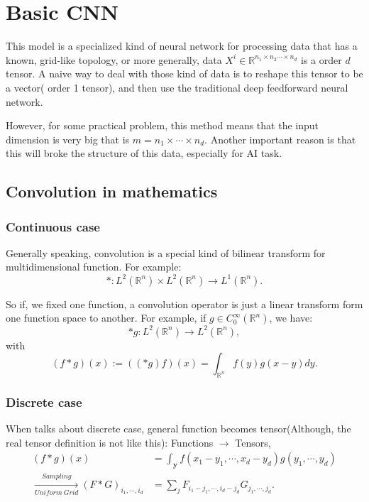 \chapter{Basic CNN}

This model is a specialized kind of neural network for processing data that has a known, grid-like topology, or more generally, data $X^i \in \mathbb{R}^{n_1\times n_2\cdots\times n_d}$ is a order $d$ tensor. A naive way to deal with those kind of data is to reshape this tensor to be a vector( order 1 tensor), and then use the traditional deep feedforward neural network.

However, for some practical problem, this method means that the input dimension is very big that is $m = n_1\times\cdots \times n_d$. Another important reason is that this will broke the structure of this data, especially for AI task.

\section{Convolution in mathematics}
\subsection{Continuous case}
Generally speaking, convolution is a special kind of bilinear transform for multidimensional function. For example:
\begin{equation}
\ast: L^2(\mathbb{R}^n) \times L^2(\mathbb{R}^n) \to L^1(\mathbb{R}^n).
\end{equation}

So if, we fixed one function, a convolution operator is just a linear transform form one function space to another. For example, if $g \in C_0^{\infty}(\mathbb{R}^n)$, we have:
\begin{equation}
\ast g: L^2(\mathbb{R}^n) \to L^2(\mathbb{R}^n),
\end{equation}
with 
\begin{equation}
(f\ast g)(x) := ((\ast g)f )(x) = \int_{\mathbb{R}^n} f(y)g(x-y) dy. 
\end{equation}

\subsection{Discrete case}
When talks about discrete case, general function becomes tensor(Although, the real tensor definition is not like this):
Functions $\to$ Tensors, 
\begin{align}
(f\ast g)(x) &= \int_{\bm{y}} f(x_1 - y_1,\cdots,x_d - y_d)g(y_1,\cdots,y_d) \\
\xrightarrow[Uniform~Grid]{Sampling} (F\ast G)_{i_1, \cdots, i_d} &= \sum_j F_{i_1 - j_1,\cdots,i_d - j_d}G_{j_1, \cdots, j_d}.
\end{align}


